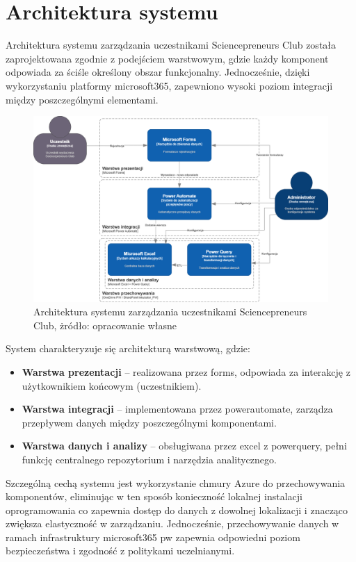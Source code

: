 \section{Architektura systemu}
Architektura systemu zarządzania uczestnikami Sciencepreneurs Club została zaprojektowana zgodnie z podejściem warstwowym, gdzie każdy komponent odpowiada za ściśle określony obszar funkcjonalny. Jednocześnie, dzięki wykorzystaniu platformy \gls{microsoft365}, zapewniono wysoki poziom integracji między poszczególnymi elementami.

\begin{figure}[!ht]
\centering
\includegraphics[width=1\linewidth]{rysunki/ArchitekturaSystemu.PNG}
\caption{Architektura systemu zarządzania uczestnikami Sciencepreneurs Club, żródło: opracowanie własne}
\label{fig}
\end{figure}

System charakteryzuje się architekturą warstwową, gdzie:

\begin{itemize}
\item \textbf{Warstwa prezentacji} – realizowana przez \gls{forms}, odpowiada za interakcję z użytkownikiem końcowym (uczestnikiem).
\item \textbf{Warstwa integracji} – implementowana przez \gls{powerautomate}, zarządza przepływem danych między poszczególnymi komponentami.
\item \textbf{Warstwa danych i analizy} – obsługiwana przez \gls{excel} z \gls{powerquery}, pełni funkcję centralnego repozytorium i narzędzia analitycznego.
\end{itemize}

Szczególną cechą systemu jest wykorzystanie chmury Azure do przechowywania komponentów, eliminując w ten sposób konieczność lokalnej instalacji oprogramowania co zapewnia dostęp do danych z dowolnej lokalizacji i znacząco zwiększa elastyczność w zarządzaniu. Jednocześnie, przechowywanie danych w ramach infrastruktury \gls{microsoft365} \gls{pw} zapewnia odpowiedni poziom bezpieczeństwa i zgodność z politykami uczelnianymi.

